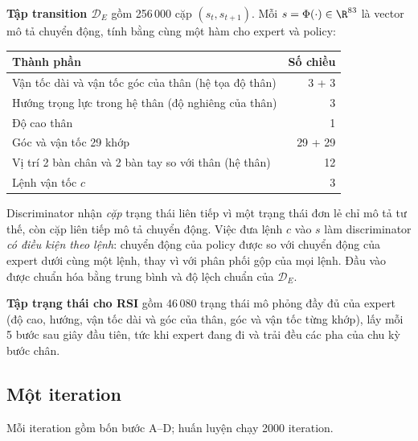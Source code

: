 \textbf{Tập transition $\mathcal{D}_E$} gồm 256\,000 cặp $(s_t, s_{t+1})$. Mỗi $s = \Phi(\cdot)
\in \R^{83}$ là vector mô tả chuyển động, tính bằng cùng một hàm cho expert và policy:
\begin{center}
\small
\begin{tabular}{@{}lr@{}}
\toprule
Thành phần & Số chiều \\
\midrule
Vận tốc dài và vận tốc góc của thân (hệ tọa độ thân) & 3 + 3 \\
Hướng trọng lực trong hệ thân (độ nghiêng của thân) & 3 \\
Độ cao thân & 1 \\
Góc và vận tốc 29 khớp & 29 + 29 \\
Vị trí 2 bàn chân và 2 bàn tay so với thân (hệ thân) & 12 \\
Lệnh vận tốc $c$ & 3 \\
\bottomrule
\end{tabular}
\end{center}
Discriminator nhận \emph{cặp} trạng thái liên tiếp vì một trạng thái đơn lẻ chỉ mô tả tư
thế, còn cặp liên tiếp mô tả chuyển động. Việc đưa lệnh $c$ vào $s$ làm discriminator
\emph{có điều kiện theo lệnh}: chuyển động của policy được so với chuyển động của expert
dưới cùng một lệnh, thay vì với phân phối gộp của mọi lệnh. Đầu vào được chuẩn hóa bằng
trung bình và độ lệch chuẩn của $\mathcal{D}_E$.

\textbf{Tập trạng thái cho RSI} gồm 46\,080 trạng thái mô phỏng đầy đủ của expert (độ cao,
hướng, vận tốc dài và góc của thân, góc và vận tốc từng khớp), lấy mỗi 5 bước sau giây
đầu tiên, tức khi expert đang đi và trải đều các pha của chu kỳ bước chân.

\subsection{Một iteration}
\label{sec:iter}
Mỗi iteration gồm bốn bước A--D; huấn luyện chạy 2000 iteration.

